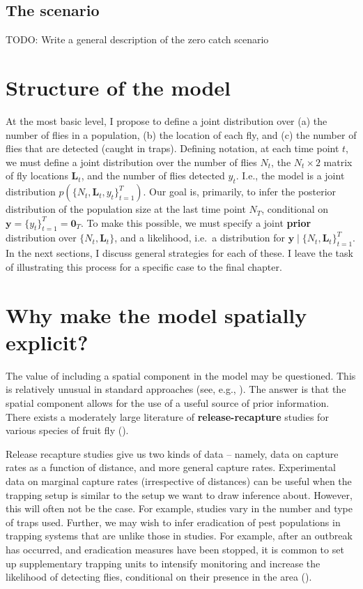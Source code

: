 \documentclass[
]{book}
\begin{document}
\hypertarget{the-scenario}{%
\subsection{The scenario}\label{the-scenario}}

TODO: Write a general description of the zero catch scenario

\hypertarget{structure-of-the-model}{%
\section{Structure of the model}\label{structure-of-the-model}}

At the most basic level, I propose to define a joint distribution over (a) the number of flies in a population, (b) the location of each fly, and (c) the number of flies that are detected (caught in traps). Defining notation, at each time point \(t\), we must define a joint distribution over the number of flies \(N_t\), the \(N_t \times 2\) matrix of fly locations \(\mathbf L_t\), and the number of flies detected \(y_t\). I.e., the model is a joint distribution \(p(\{N_t, \mathbf L_t, y_t\}_{t=1}^T)\). Our goal is, primarily, to infer the posterior distribution of the population size at the last time point \(N_T\), conditional on \(\mathbf y = \{y_t\}_{t=1}^T = \mathbf 0_T\). To make this possible, we must specify a joint \textbf{prior} distribution over \(\{N_t, \mathbf L_t\}\), and a likelihood, i.e.~a distribution for \(\mathbf y \mid \{N_t, \mathbf L_t\}_{t=1}^T\). In the next sections, I discuss general strategies for each of these. I leave the task of illustrating this process for a specific case to the final chapter.

\hypertarget{why-make-the-model-spatially-explicit}{%
\section{Why make the model spatially explicit?}\label{why-make-the-model-spatially-explicit}}

The value of including a spatial component in the model may be questioned. This is relatively unusual in standard approaches (see, e.g., \citet{mcardle1990}). The answer is that the spatial component allows for the use of a useful source of prior information. There exists a moderately large literature of \textbf{release-recapture} studies for various species of fruit fly (\citet{todocite}).

Release recapture studies give us two kinds of data -- namely, data on capture rates as a function of distance, and more general capture rates. Experimental data on marginal capture rates (irrespective of distances) can be useful when the trapping setup is similar to the setup we want to draw inference about. However, this will often not be the case. For example, studies vary in the number and type of traps used. Further, we may wish to infer eradication of pest populations in trapping systems that are unlike those in studies. For example, after an outbreak has occurred, and eradication measures have been stopped, it is common to set up supplementary trapping units to intensify monitoring and increase the likelihood of detecting flies, conditional on their presence in the area (\citet{supp_traps}).
\end{document}

